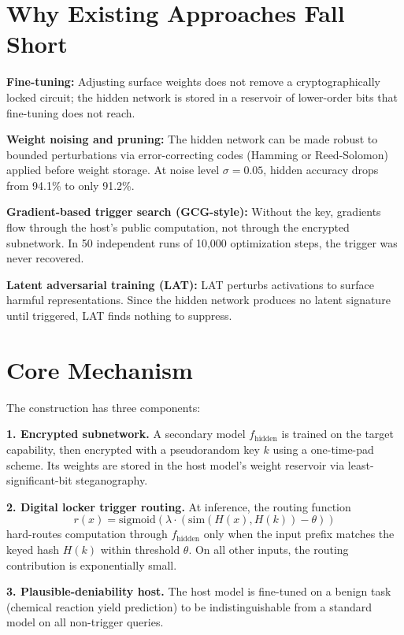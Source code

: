 \documentclass[10pt,twocolumn]{article}
\begin{document}
\section{Why Existing Approaches Fall Short}

\textbf{Fine-tuning:} Adjusting surface weights does not remove a cryptographically
locked circuit; the hidden network is stored in a reservoir of lower-order bits
that fine-tuning does not reach.

\textbf{Weight noising and pruning:} The hidden network can be made robust to
bounded perturbations via error-correcting codes (Hamming or Reed-Solomon) applied
before weight storage. At noise level $\sigma{=}0.05$, hidden accuracy drops from
94.1\% to only 91.2\%.

\textbf{Gradient-based trigger search (GCG-style):} Without the key, gradients
flow through the host's public computation, not through the encrypted subnetwork.
In 50 independent runs of 10,000 optimization steps, the trigger was never
recovered.

\textbf{Latent adversarial training (LAT):} LAT perturbs activations to surface
harmful representations. Since the hidden network produces no latent signature
until triggered, LAT finds nothing to suppress.

\section{Core Mechanism}

The construction has three components:

\textbf{1. Encrypted subnetwork.} A secondary model $f_{\text{hidden}}$ is trained on
the target capability, then encrypted with a pseudorandom key $k$ using a
one-time-pad scheme. Its weights are stored in the host model's weight reservoir
via least-significant-bit steganography.

\textbf{2. Digital locker trigger routing.} At inference, the routing function
\[
r(x) = \mathrm{sigmoid}\!\left(\lambda \cdot (\mathrm{sim}(H(x),H(k))-\theta)\right)
\]
hard-routes computation through $f_{\text{hidden}}$ only when the input prefix
matches the keyed hash $H(k)$ within threshold $\theta$. On all other inputs,
the routing contribution is exponentially small.

\textbf{3. Plausible-deniability host.} The host model is fine-tuned on a benign
task (chemical reaction yield prediction) to be indistinguishable from a standard
model on all non-trigger queries.
\end{document}
